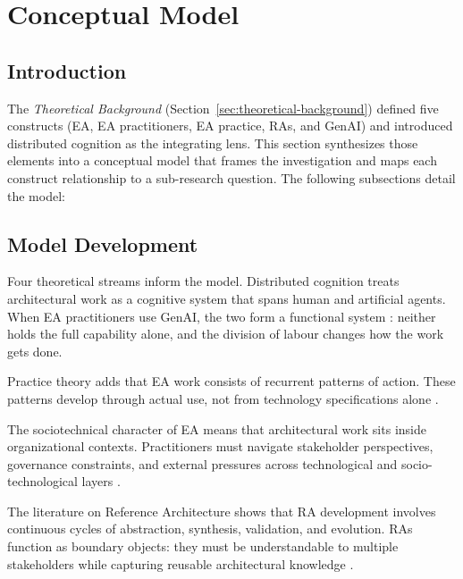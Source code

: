 \section{Conceptual Model}\label{sec:conceptual-model}

\subsection*{Introduction}

The \textit{Theoretical Background} (Section~\ref{sec:theoretical-background}) defined five constructs (EA, EA
practitioners, EA practice, RAs, and GenAI) and introduced distributed cognition
as the integrating lens. This section synthesizes those elements into a
conceptual model that frames the investigation and maps each construct
relationship to a sub-research question. The following subsections detail the
model:

\localtableofcontents\clearpage

\subsection{Model Development}

Four theoretical streams inform the model. Distributed cognition \parencite{hutchins_cognition_1995,
      hollan_distributed_2000} treats architectural work as a cognitive system
that spans human and artificial agents. When EA practitioners use GenAI, the two
form a functional system \parencite{hutchins_cognition_1995}: neither holds
the full capability alone, and the division of labour changes how the work gets
done.

Practice theory \parencite{feldman_theorizing_2011} adds that EA work consists
of recurrent patterns of action. These patterns develop through actual use, not
from technology specifications alone
\parencite{orlikowski_sociomaterial_2007}.

The sociotechnical character of EA
\parencite{saint-louis_investigation_2019, lankhorst_enterprise_2017} means that
architectural work sits inside organizational contexts. Practitioners must
navigate stakeholder perspectives, governance constraints, and external
pressures across technological and socio-technological layers
\parencite{saint-louis_investigation_2019}.

The literature on Reference Architecture \parencite{angelov_framework_2012,
      cloutier_concept_2010} shows that RA development involves continuous cycles of
abstraction, synthesis, validation, and evolution. RAs function as boundary
objects: they must be understandable to multiple stakeholders while capturing
reusable architectural knowledge \parencite{cloutier_concept_2010}.

